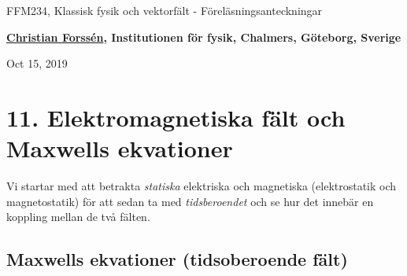 \documentclass[%
oneside,                 %
final,                   %
10pt]{article}
\begin{document}

\newcommand{\exercisesection}[1]{\subsection*{#1}}







\thispagestyle{empty}

\begin{center}
{\LARGE\bf
\begin{spacing}{1.25}
FFM234, Klassisk fysik och vektorfält - Föreläsningsanteckningar
\end{spacing}
}
\end{center}


\begin{center}
{\bf \href{{http://fy.chalmers.se/subatom/tsp/}}{Christian Forssén}, Institutionen för fysik, Chalmers, Göteborg, Sverige${}^{}$} \\ [0mm]
\end{center}

\begin{center}
\end{center}
    

\begin{center}
Oct 15, 2019
\end{center}

\vspace{1cm}


\section*{11. Elektromagnetiska fält och Maxwells ekvationer}

Vi startar med att betrakta \emph{statiska} elektriska och magnetiska (elektrostatik och magnetostatik) för att sedan ta med \emph{tidsberoendet} och se hur det innebär en koppling mellan de två fälten.

\subsection*{Maxwells ekvationer (tidsoberoende fält)}
\end{document}
